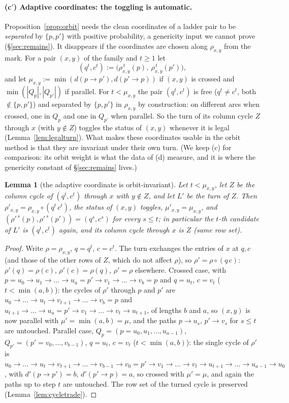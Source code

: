 \documentclass[11pt]{article}
\newtheorem{lemma}[theorem]{Lemma}
\theoremstyle{definition}
\begin{document}
\paragraph{(c$'$) Adaptive coordinates: the toggling is automatic.}
Proposition~\ref{prop:orbit} needs the clean coordinates of a ladder pair to be
\emph{separated} by $\{p,p'\}$ with positive probability, a genericity input we cannot prove
(\S\ref{sec:remains}).  It disappears if the coordinates are chosen along $\rho_{x,y}$ from
the mark.  For a pair $(x,y)$ of the family and $t\ge1$ let
\[
(q^t,c^t):=\bigl(\rho_{x,y}^{\,t}(p),\ \rho_{x,y}^{\,t}(p')\bigr),
\]
and let $\mu_{x,y}:=\min(d(p\to p'),d(p'\to p))$ if $(x,y)$ is crossed and
$\min(|Q_p|,|Q_{p'}|)$ if parallel.  For $t<\mu_{x,y}$ the pair $(q^t,c^t)$ is free
($q^t\ne c^t$, both $\notin\{p,p'\}$) and separated by $\{p,p'\}$ in $\rho_{x,y}$ by
construction: on different arcs when crossed, one in $Q_p$ and one in $Q_{p'}$ when parallel.
So the turn of its column cycle $Z$ through $x$ (with $y\notin Z$) toggles the status of
$(x,y)$ whenever it is legal (Lemma~\ref{lem:legalturn}).  What makes these coordinates
usable in the orbit method is that they are invariant under their own turn.  (We keep (c)
for comparison: its orbit weight is what the data of (d) measure, and it is where the
genericity constant of \S\ref{sec:remains} lives.)


\begin{lemma}[the adaptive coordinate is orbit-invariant]\label{lem:adaptinv}
Let $t<\mu_{x,y}$, let $Z$ be the column cycle of $(q^t,c^t)$ through
$x$ with $y\notin Z$, and let $L'$ be the turn of $Z$.  Then
$\rho'_{x,y}=\rho_{x,y}\circ(q^t\,c^t)$, the status of $(x,y)$ toggles,
$\mu'_{x,y}=\mu_{x,y}$, and $(\rho'^{\,s}(p),\rho'^{\,s}(p'))=(q^s,c^s)$
for every $s\le t$; in particular the $t$-th candidate of $L'$ is
$(q^t,c^t)$ again, and its column cycle through $x$ is $Z$ (same row
set).
\end{lemma}
\begin{proof}
Write $\rho=\rho_{x,y}$, $q=q^t$, $c=c^t$.  The turn exchanges the
entries of $x$ at $q,c$ (and those of the other rows of $Z$, which do
not affect $\rho$), so $\rho'=\rho\circ(q\,c)$: $\rho'(q)=\rho(c)$,
$\rho'(c)=\rho(q)$, $\rho'=\rho$ elsewhere.  Crossed case, with
$p=u_0\to u_1\to\dots\to u_a=p'\to v_1\to\dots\to v_b=p$ and
$q=u_t$, $c=v_t$ ($t<\min(a,b)$): the cycles of $\rho'$ through $p$
and $p'$ are $u_0\to\dots\to u_t\to v_{t+1}\to\dots\to v_b=p$ and
$u_{t+1}\to\dots\to u_a=p'\to v_1\to\dots\to v_t\to u_{t+1}$, of
lengths $b$ and $a$, so $(x,y)$ is now parallel with
$\mu'=\min(a,b)=\mu$, and the paths $p\to u_s$, $p'\to v_s$ for
$s\le t$ are untouched.  Parallel case, $Q_p=(p=u_0,u_1,\dots,u_{a-1})$,
$Q_{p'}=(p'=v_0,\dots,v_{b-1})$, $q=u_t$, $c=v_t$ ($t<\min(a,b)$): the
single cycle of $\rho'$ is
$u_0\to\dots\to u_t\to v_{t+1}\to\dots\to v_{b-1}\to v_0=p'\to v_1\to\dots\to v_t\to u_{t+1}\to\dots\to u_{a-1}\to u_0$,
with $d'(p\to p')=b$, $d'(p'\to p)=a$, so crossed with $\mu'=\mu$, and
again the paths up to step $t$ are untouched.  The row set of the
turned cycle is preserved (Lemma~\ref{lem:cycletrade}).
\end{proof}
\end{document}
